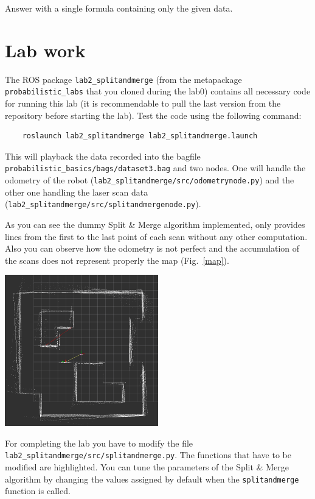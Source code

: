 \documentclass[a4paper,10pt]{article}
\begin{document}
\noindent
Answer with a single formula containing only the given data.

\section{Lab work}

The ROS package \texttt{lab2\_splitandmerge} (from the metapackage \texttt{probabilistic\_labs} that you cloned during the lab0) contains all necessary code for running this lab (it is recommendable to pull the last version from the repository before starting the lab). Test the code using the following command:

\begin{verbatim}
    roslaunch lab2_splitandmerge lab2_splitandmerge.launch
\end{verbatim}

This will playback the data recorded into the bagfile \texttt{probabilistic\_basics/bags/dataset3.bag} and two nodes. One will handle the odometry of the robot (\texttt{lab2\_splitandmerge/src/odometrynode.py}) and the other one handling the laser scan data (\texttt{lab2\_splitandmerge/src/splitandmergenode.py}).

As you can see the dummy Split \& Merge algorithm implemented, only provides lines from the first to the last point of each scan without any other computation. Also you can observe how
the odometry is not perfect and the accumulation of the scans does not represent properly the map (Fig.~\ref{map}).

\begin{center}
	\includegraphics[width=0.5\textwidth]{scans_dataset3}
	\label{map}
\end{center}

For completing the lab you have to modify the file \texttt{lab2\_splitandmerge/src/splitandmerge.py}. The functions that have to be modified are highlighted. You can tune the parameters of the Split \& Merge algorithm by changing the values assigned by default when the \texttt{splitandmerge} function is called.
\end{document}
